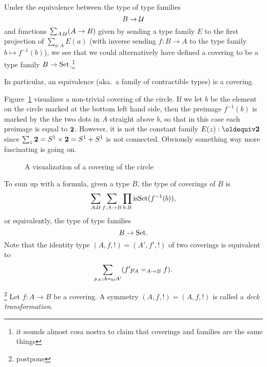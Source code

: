 \begin{remark}\label{rem:coveringsasfamilies}
  Under the equivalence between the type of type families 
$$B\to\mathcal{U}$$ and functions $\sum_{A:\mathcal{U}}(A\to B)$ given by sending a type family $E$ to the first projection of $\sum_{a:A}E(a)$ (with inverse sending $f:B\to A$ to the type family $b\mapsto f^{-1}(b)$), we see that we could alternatively have defined a covering to be a type family $B\to\mathord{\mathrm{Set}}$.\footnote{it sounds almost cosa nostra to claim that coverings and families are the same things}  

In particular, an equivalence (aka.~a family of contractible types) is a covering.
\end{remark}


 Figure~\ref{fig:covering} visualizes a non-trivial covering of the circle.  If we let $b$ be the element on the circle marked at the bottom left hand side, then the preimage $f^{-1}(b)$ is marked by the the two dots in $A$ straight above $b$, so that in this case each preimage is equal to $\mathbf{2}$.  However, it is not the constant family $E(z)\defequi\bn 2$ since $\sum_{z}\mathbf{2}=S^1\times\mathbf{2}=S^1+S^1$ is not connected.  Obviously something way more fascinating is going on.
\begin{figure}
  \centering
  \caption{A visualization of a covering of the circle}
  \label{fig:covering}
\end{figure}



To sum up with a formula, 
given a type $B$, the type of coverings of $B$ is
$$\sum_{A:\mathcal{U}}\sum_{f:A\to B}\prod_{b:B}\mathrm{isSet}(f^{-1}(b)),$$ 
or equivalently, the type of type families
$$B\to\mathord{\mathrm{Set}}.$$
Note that the identity type  $(A,f,!)=(A',f',!)$ of two coverings is equivalent to 
$$\sum_{p_A:A=_{\mathcal{U}}A'}(f'p_A=_{A\to B}f).$$
\begin{definition}\label{def:decktrafo}\footnote{postpone}
  Let $f:A\to B$ be a covering.  A symmetry $(A,f,!)=(A,f,!)$ is called a \emph{deck transformation}.
\end{definition}

